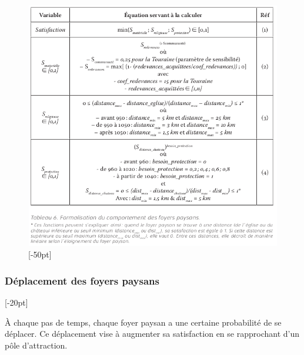 \documentclass[12pt, a4paper, oneside]{book}
\begin{document}
\begin{figure}[H]
	\centering
	\includegraphics[width=1\linewidth]{src/Chapitre_TMD/Tab6.png}
	[-50pt]
\end{figure}

	\subsubsection{Déplacement des foyers paysans}[-20pt]
	
	À chaque pas de temps, chaque foyer paysan a une certaine probabilité de se déplacer.
	Ce déplacement vise à augmenter sa satisfaction en se rapprochant d'un pôle d'attraction.
	
\end{document}

